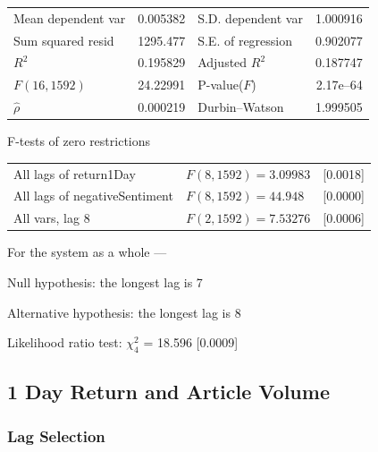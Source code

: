 \begin{center}
\vspace{1ex}
\begin{tabular}{lrlr}
Mean dependent var &  0.005382 & S.D. dependent var &  1.000916 \\
Sum squared resid &  1295.477 & S.E. of regression &  0.902077 \\
$R^2$ &  0.195829 & Adjusted $R^2$ &  0.187747 \\
$F(16, 1592)$ &  24.22991 & P-value($F$) &  2.17\textrm{e--64} \\
$\hat{\rho}$ &  0.000219 & Durbin--Watson &  1.999505 \\
\end{tabular}


\end{center}

\begin{center}
F-tests of zero restrictions\\[1em]
\begin{tabular}{lll}
All lags of return1Day & $F(8, 1592) = 3.09983$ & [0.0018]\\
All lags of negativeSentiment & $F(8, 1592) = 44.948$ & [0.0000]\\
All vars, lag 8 & $F(2, 1592) = 7.53276$ & [0.0006]\\
\end{tabular}
\end{center}

\clearpage


\noindent For the system as a whole ---\par
Null hypothesis: the longest lag is 7\par
Alternative hypothesis: the longest lag is 8\par
Likelihood ratio test: $\chi^2_{4}$ = 18.596 [0.0009]\par    

\subsection{1 Day Return and Article Volume}

\subsubsection{Lag Selection}

